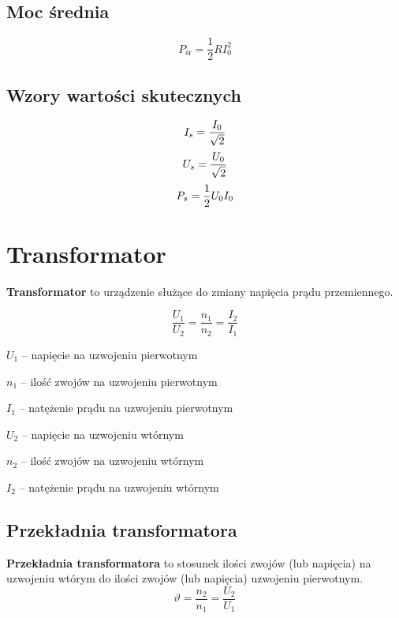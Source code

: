 \subsection{Moc średnia}
\begin{equation}
  P_\text{śr} = \frac 1 2 R I_0^2
\end{equation}

\subsection{Wzory wartości skutecznych}
\begin{subequations}
  \setlength\jot{5pt}
  \begin{gather}
    I_s = \frac{I_0}{\sqrt 2}\\
    U_s = \frac{U_0}{\sqrt 2}\\
    P_s = \frac 1 2 U_0 I_0\\
  \end{gather}
\end{subequations}

\section{Transformator}
\begin{definition}
  \textbf{Transformator} to urządzenie służące do zmiany napięcia prądu przemiennego.

  \begin{equation}
    \frac{U_1}{U_2} = \frac{n_1}{n_2} = \frac{I_2}{I_1}
  \end{equation}
  \begin{symbols}
    \item $U_1$ -- napięcie na uzwojeniu pierwotnym
    \item $n_1$ -- ilość zwojów na uzwojeniu pierwotnym
    \item $I_1$ -- natężenie prądu na uzwojeniu pierwotnym
      \vspace{10pt}
    \item $U_2$ -- napięcie na uzwojeniu wtórnym
    \item $n_2$ -- ilość zwojów na uzwojeniu wtórnym
    \item $I_2$ -- natężenie prądu na uzwojeniu wtórnym
  \end{symbols}
\end{definition}

\subsection{Przekładnia transformatora}
\begin{definition}
  \textbf{Przekładnia transformatora} to stosunek ilości zwojów (lub napięcia) na uzwojeniu wtórym
  do ilości zwojów (lub napięcia) uzwojeniu pierwotnym.
  \begin{equation}
    \vartheta = \frac{n_2}{n_1} = \frac{U_2}{U_1}
  \end{equation}
\end{definition}
